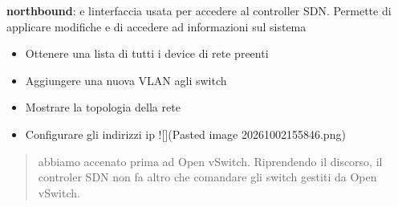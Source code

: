 \textbf{northbound}: e\textquotesingle{} l\textquotesingle interfaccia
usata per accedere al controller SDN. Permette di applicare modifiche e
di accedere ad informazioni sul sistema

\begin{itemize}
\tightlist
\item
  Ottenere una lista di tutti i device di rete preenti
\item
  Aggiungere una nuova VLAN agli switch
\item
  Mostrare la topologia della rete
\item
  Configurare gli indirizzi ip !{[}{]}(Pasted image 20261002155846.png)
\end{itemize}

\begin{quote}
abbiamo accenato prima ad Open vSwitch. Riprendendo il discorso, il
controler SDN non fa altro che comandare gli switch gestiti da Open
vSwitch.
\end{quote}
